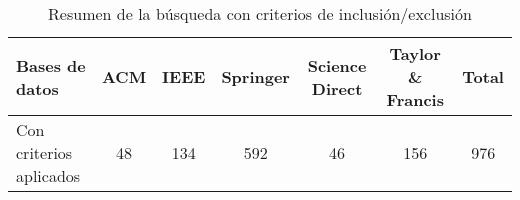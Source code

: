 \begin{table}[H]
\centering
\scriptsize
\setlength{\tabcolsep}{4pt}
\renewcommand{\arraystretch}{1.1}
\begin{tabular}{|l|c|c|c|c|c|c|}
\hline
\textbf{Bases de datos} & \textbf{ACM} & \textbf{IEEE} & \textbf{Springer} & \textbf{Science Direct} & \textbf{Taylor \& Francis} & \textbf{Total} \\
\hline
Con criterios aplicados & 48 & 134 & 592 & 46 & 156 & 976 \\
\hline
\end{tabular}
\caption{Resumen de la búsqueda con criterios de inclusión/exclusión}\label{tab:resumen-busqueda}
\end{table}